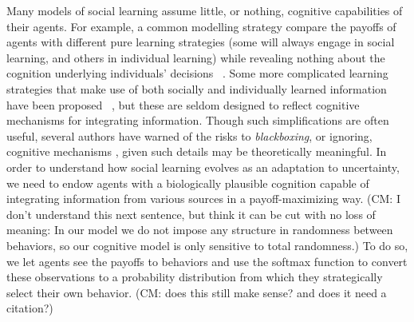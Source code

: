 \documentclass[letterpaper,11.5pt]{scrartcl}
\newcommand{\cm}[1]{{\textcolor{mypurple} {({\tiny CM:} #1)}}}
\newcommand{\ps}[1]{{\textcolor{mygreen} {({\tiny PS:} #1)}}}
\begin{document}
Many models of social learning assume little, or nothing, cognitive capabilities of their agents. For example, a common modelling strategy compare the payoffs of agents with different pure learning strategies (some will always engage in social learning, and others in individual learning) while revealing nothing about the cognition underlying individuals' decisions  ~\cite{BoydRicherson1985, Rogers1988, aoki2005}. Some more complicated learning strategies that make use of both socially and individually learned information have been proposed ~\cite{Enquist2007, perreault2012bayesian}, but these are seldom designed to reflect cognitive mechanisms for integrating information. Though such simplifications are often useful, several authors have warned of the risks to \emph{blackboxing}, or ignoring, cognitive mechanisms \cite[p. 658]{Heyes2016, Kendal2018}, given such details may be theoretically meaningful. In order to understand how social learning evolves as an adaptation to uncertainty, we need to endow agents with a  biologically plausible cognition capable of integrating information from various sources in a payoff-maximizing way. \cm{I don't understand this next sentence, but think it can be cut with no loss of meaning: In our model we do not impose any structure in randomness between behaviors, so our cognitive model is only sensitive to total randomness.} To do so, we let agents see the payoffs to behaviors and use the softmax function to convert these observations to a probability distribution from which they strategically select their own behavior. \cm{does this still make sense? and does it need a citation?}


\end{document}
